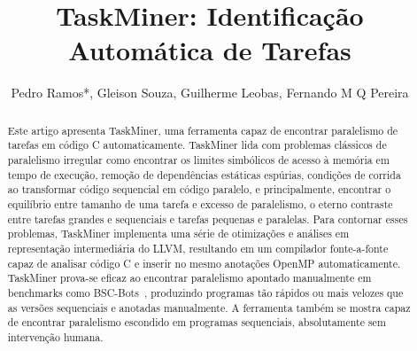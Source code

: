 \documentclass[sigplan,10pt,review]{acmart}
\newcommand\Taskminer{\mbox{\textsf{TaskMiner}}}
\begin{document}
\title[Automatic Identification and Annotation of Tasks in Structured
Programs]
{TaskMiner: Identificação Automática de Tarefas}



\author{Pedro Ramos*, Gleison Souza, Guilherme Leobas, Fernando M Q Pereira}




\begin{abstract}
Este artigo apresenta \Taskminer{}, uma ferramenta capaz de encontrar paralelismo de tarefas
em código C automaticamente. \Taskminer{} lida com problemas clássicos de paralelismo irregular como
encontrar os limites simbólicos de acesso à memória em tempo de execução, remoção de dependências
estáticas espúrias, condições de corrida ao transformar código sequencial em código paralelo, e
principalmente, encontrar o equilíbrio entre tamanho de uma tarefa e excesso de paralelismo, o eterno contraste entre tarefas grandes e sequenciais e tarefas pequenas e paralelas. Para contornar esses problemas,
\Taskminer{} implementa uma série de otimizações e análises em representação intermediária do LLVM, resultando
em um compilador fonte-a-fonte capaz de analisar código C e inserir no mesmo anotações OpenMP automaticamente. \Taskminer{} prova-se eficaz ao encontrar paralelismo apontado manualmente em benchmarks como \textsf{BSC-Bots}~\cite{Duran09}, produzindo programas tão rápidos ou mais velozes que as versões sequenciais e anotadas manualmente. A ferramenta também se mostra capaz de encontrar paralelismo escondido em programas sequenciais, absolutamente sem intervenção humana.
\end{abstract}
\end{document}
